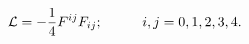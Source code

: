 \begin{equation}
{\cal L} = -{\frac{1}{4}}{F^{ij}F_{ij}} ; \hskip 1.0cm i
,j = 0, 1, 2, 3, 4.
\label{89}
\end{equation}

